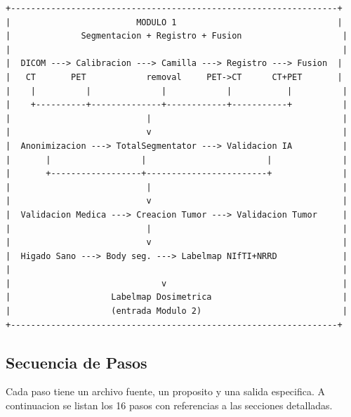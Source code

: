 \documentclass[12pt,a4paper]{article}
\begin{document}
\begin{verbatim}
+-----------------------------------------------------------------+
|                         MODULO 1                                |
|              Segmentacion + Registro + Fusion                    |
|                                                                  |
|  DICOM ---> Calibracion ---> Camilla ---> Registro ---> Fusion  |
|   CT       PET            removal     PET->CT      CT+PET       |
|    |          |              |            |           |          |
|    +----------+--------------+------------+-----------+          |
|                           |                                      |
|                           v                                      |
|  Anonimizacion ---> TotalSegmentator ---> Validacion IA          |
|       |                  |                        |              |
|       +------------------+------------------------+              |
|                           |                                      |
|                           v                                      |
|  Validacion Medica ---> Creacion Tumor ---> Validacion Tumor     |
|                           |                                      |
|                           v                                      |
|  Higado Sano ---> Body seg. ---> Labelmap NIfTI+NRRD             |
|                                                                  |
|                              v                                   |
|                    Labelmap Dosimetrica                          |
|                    (entrada Modulo 2)                            |
+-----------------------------------------------------------------+
\end{verbatim}

\subsection{Secuencia de Pasos}

Cada paso tiene un archivo fuente, un proposito y una salida especifica.
A continuacion se listan los 16 pasos con referencias a las secciones detalladas.
\end{document}
